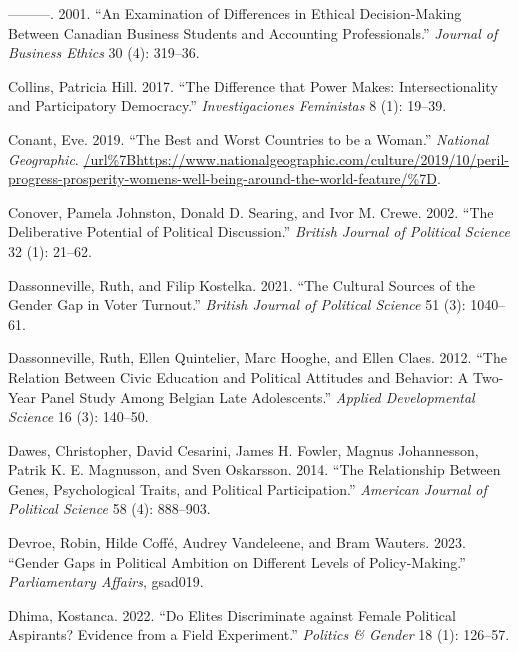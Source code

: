 \documentclass[
  letterpaper,
  DIV=11,
  numbers=noendperiod]{scrreprt}
\newlength{\cslhangindent}
\newlength{\cslentryspacingunit} %
\newenvironment{CSLReferences}[2] %
 {%
  \setlength{\parindent}{0pt}
  \ifodd #1
  \let\oldpar\par
  \def\par{\hangindent=\cslhangindent\oldpar}
  \fi
  \setlength{\parskip}{#2\cslentryspacingunit}
 }%
 {}
\begin{document}
\begin{CSLReferences}{1}{0}
\leavevmode{}%
---------. 2001. {``{An Examination of Differences in Ethical
Decision-Making Between Canadian Business Students and Accounting
Professionals}.''} \emph{Journal of Business Ethics} 30 (4): 319--36.

\leavevmode{}%
Collins, Patricia Hill. 2017. {``{The Difference that Power Makes:
Intersectionality and Participatory Democracy}.''} \emph{Investigaciones
Feministas} 8 (1): 19--39.

\leavevmode{}%
Conant, Eve. 2019. {``{The Best and Worst Countries to be a Woman}.''}
\emph{National Geographic}.
\url{/url\%7Bhttps://www.nationalgeographic.com/culture/2019/10/peril-progress-prosperity-womens-well-being-around-the-world-feature/\%7D}.

\leavevmode{}%
Conover, Pamela Johnston, Donald D. Searing, and Ivor M. Crewe. 2002.
{``{The Deliberative Potential of Political Discussion}.''}
\emph{British Journal of Political Science} 32 (1): 21--62.

\leavevmode{}%
Dassonneville, Ruth, and Filip Kostelka. 2021. {``{The Cultural Sources
of the Gender Gap in Voter Turnout}.''} \emph{{British Journal of
Political Science}} 51 (3): 1040--61.

\leavevmode{}%
Dassonneville, Ruth, Ellen Quintelier, Marc Hooghe, and Ellen Claes.
2012. {``{The Relation Between Civic Education and Political Attitudes
and Behavior: A Two-Year Panel Study Among Belgian Late Adolescents}.''}
\emph{Applied Developmental Science} 16 (3): 140--50.

\leavevmode{}%
Dawes, Christopher, David Cesarini, James H. Fowler, Magnus Johannesson,
Patrik K. E. Magnusson, and Sven Oskarsson. 2014. {``{The Relationship
Between Genes, Psychological Traits, and Political Participation}.''}
\emph{American Journal of Political Science} 58 (4): 888--903.

\leavevmode{}%
Devroe, Robin, Hilde Coffé, Audrey Vandeleene, and Bram Wauters. 2023.
{``{Gender Gaps in Political Ambition on Different Levels of
Policy-Making}.''} \emph{Parliamentary Affairs}, gsad019.

\leavevmode{}%
Dhima, Kostanca. 2022. {``{Do Elites Discriminate against Female
Political Aspirants? Evidence from a Field Experiment}.''}
\emph{Politics \& Gender} 18 (1): 126--57.


\end{CSLReferences}
\end{document}
